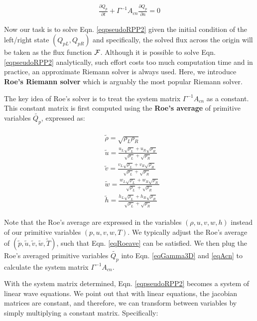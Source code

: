 \documentclass[12pt, letterpaper]{report}
\begin{document}
\begin{align}\label{eqpseudoRPP2}
   \frac{\partial Q_p}{\partial t} + \Gamma^{-1} A_{cn} \frac{\partial Q_p}{\partial n} = 0
\end{align}

Now our task is to solve Eqn. \ref{eqpseudoRPP2} given the initial condition of the left/right
state $(Q_{pL}, Q_{pR})$ and specifically, the solved flux across the origin will be taken as the
flux function $\mathcal{F}$. Although it is possible to solve Eqn. \ref{eqpseudoRPP2} analytically, such
effort costs too much computation time and in practice, an approximate Riemann solver is always
used. Here, we introduce {\bf Roe's Riemann solver} which is arguably the most popular Riemann
solver. \paraspace

The key idea of Roe's solver is to treat the system matrix $\Gamma^{-1} A_{cn}$ as a constant. This
constant matrix is first computed using the {\bf Roe's average} of primitive variables
$\tilde{Q_p}$, expressed as:

\begin{align}\label{eqRoeave}
   \begin{split}
      &\tilde{\rho} = \sqrt{\rho_L \rho_R} \\
      &\tilde{u} = \frac{u_L \sqrt{\rho_L} + u_R \sqrt{\rho_R}}{\sqrt{\rho_L} + \sqrt{\rho_R}} \\
      &\tilde{v} = \frac{v_L \sqrt{\rho_L} + v_R \sqrt{\rho_R}}{\sqrt{\rho_L} + \sqrt{\rho_R}} \\
      &\tilde{w} = \frac{w_L \sqrt{\rho_L} + w_R \sqrt{\rho_R}}{\sqrt{\rho_L} + \sqrt{\rho_R}} \\
      &\tilde{h} = \frac{h_L \sqrt{\rho_L} + h_R \sqrt{\rho_R}}{\sqrt{\rho_L} + \sqrt{\rho_R}} 
   \end{split}
\end{align}

Note that the Roe's average are expressed in the variables $(\rho,u,v,w,h)$ instead of our primitive
variables $(p,u,v,w,T)$. We typically adjust the Roe's average of $(\tilde{p}, \tilde{u}, \tilde{v},
\tilde{w}, \tilde{T})$, such that Eqn. \ref{eqRoeave} can be satisfied. We then plug the Roe's
averaged primitive variables $\tilde{Q_p}$ into Eqn. \ref{eqGamma3D} and \ref{eqAcn} to calculate
the system matrix $\Gamma^{-1} A_{cn}$. \paraspace

With the system matrix determined, Eqn. \ref{eqpseudoRPP2} becomes a system of linear wave
equations. We point out that with linear equations, the jacobian matrices are constant, and
therefore, we can transform between variables by simply multiplying a constant matrix. Specifically:
\end{document}
